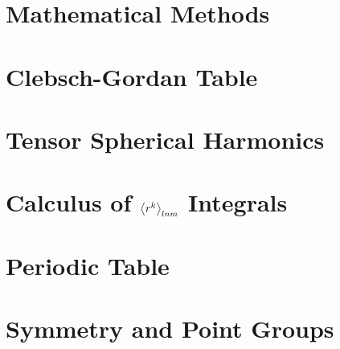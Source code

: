 \documentclass[a4paper, 11pt]{book}
\newcommand{\1}{\opr{\mathds{1}}}
\theoremstyle{plain}
\begin{document}
\appendix
		\chapter{Mathematical Methods}
	
		\chapter{Clebsch-Gordan Table}
	
		\chapter{Tensor Spherical Harmonics}\label{app:tsh}
	
		\chapter{Calculus of $\expval{r^k}_{lnm}$ Integrals}
	
		\chapter{Periodic Table}
	
		\chapter{Symmetry and Point Groups}\label{app:groups}
	
\nocite{quantistica,landau3,statistica,struttura,struttura1,griffmq,sakuraimqm,patritesta,molekulphysik,complessa}
\printbibliography
\end{document}
